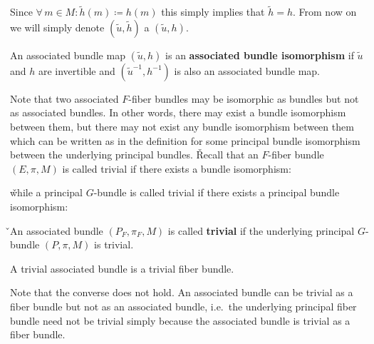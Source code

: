 Since $\forall \, m \in M : \widetilde h (m) \coloneqq h (m)$ this simply implies that $\widetilde h = h$. From now
on we will simply denote $(\widetilde u, \widetilde h)$ a $(\widetilde u, h) $.

An associated bundle map $(\widetilde u,h)$ is an \textbf{associated bundle isomorphism} if $\widetilde u$ and $h$
are invertible and $ (\widetilde u^{-1},h^{-1})$ is also an associated bundle map.
\ed

Note that two associated $F$-fiber bundles may be isomorphic as bundles but not as associated bundles. In other
words, there may exist a bundle isomorphism between them, but there may not exist any bundle isomorphism between them
which can be written as in the definition for some principal bundle isomorphism between the underlying principal
bundles. \v

Recall that an $F$-fiber bundle $(E,\pi,M)$ is called trivial if there exists a bundle isomorphism:
\bse
{}
\ese

\v

while a principal $G$-bundle is called trivial if there exists a principal bundle isomorphism:
\bse
{}
\ese

\v

An associated bundle $(P_F,\pi_F,M)$ is called \textbf{trivial} if the underlying principal $G$-bundle $(P,\pi,M)$ is
trivial.
\ed

\bt[]
A trivial associated bundle is a trivial fiber bundle.
\et

Note that the converse does not hold. An associated bundle can be trivial as a fiber bundle but not as an associated
bundle, i.e.\ the underlying principal fiber bundle need not be trivial simply because the associated bundle is
trivial as a fiber bundle.

